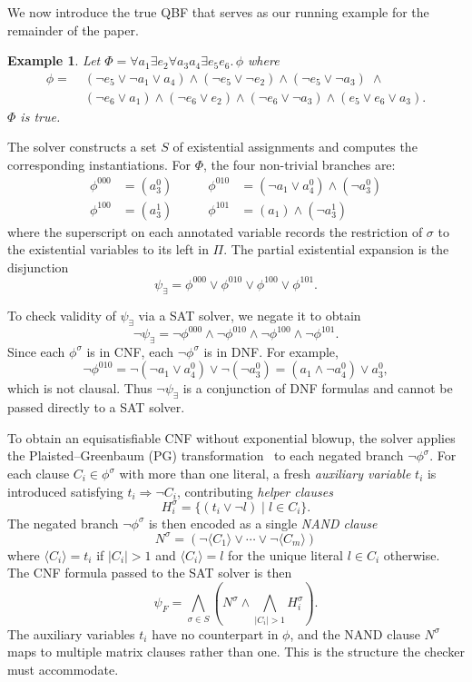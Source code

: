 \documentclass{article}
\newtheorem{example}{Example}
\begin{document}
We now introduce the true QBF that serves as our running example for the remainder
of the paper.

\begin{example}
    \label{ex:running-true}
    Let $\Phi = \forall a_1 \exists e_2 \forall a_3 a_4 \exists e_5 e_6.\, \phi$
    where
    \begin{align*}
        \phi = \; & (\neg e_5 \vee \neg a_1 \vee a_4) \wedge
        (\neg e_5 \vee \neg e_2) \wedge
        (\neg e_5 \vee \neg a_3) \;\wedge                    \\
                  & (\neg e_6 \vee a_1) \wedge
        (\neg e_6 \vee e_2) \wedge
        (\neg e_6 \vee \neg a_3) \wedge
        (e_5 \vee e_6 \vee a_3).
    \end{align*}
    $\Phi$ is true.
\end{example}


The solver constructs a set $S$ of existential assignments and computes the
corresponding instantiations. For $\Phi$, the four non-trivial branches are:
\begin{align*}
    \phi^{000} & = (a_3^0) \qquad & \phi^{010} & = (\neg a_1 \vee a_4^0) \wedge (\neg a_3^0) \\
    \phi^{100} & = (a_3^1) \qquad & \phi^{101} & = (a_1) \wedge (\neg a_3^1)
\end{align*}
where the superscript on each annotated variable records the restriction of $\sigma$
to the existential variables to its left in $\Pi$. The partial existential expansion
is the disjunction
\[
    \psi_\exists = \phi^{000} \vee \phi^{010} \vee \phi^{100} \vee \phi^{101}.
\]

To check validity of $\psi_\exists$ via a SAT solver, we negate it to obtain
\[
    \neg\psi_\exists = \neg\phi^{000} \wedge \neg\phi^{010} \wedge \neg\phi^{100}
    \wedge \neg\phi^{101}.
\]
Since each $\phi^\sigma$ is in CNF, each $\neg\phi^\sigma$ is in DNF. For example,
\[
    \neg\phi^{010} = \neg(\neg a_1 \vee a_4^0) \vee \neg(\neg a_3^0)
    = (a_1 \wedge \neg a_4^0) \vee a_3^0,
\]
which is not clausal. Thus $\neg\psi_\exists$ is a conjunction of DNF formulas and  cannot be passed directly to a SAT solver.

To obtain an equisatisfiable CNF without exponential blowup, the solver applies the
Plaisted--Greenbaum (PG) transformation~\cite{pg} to each negated branch $\neg\phi^\sigma$.
For each clause $C_i \in \phi^\sigma$ with more than one literal, a fresh
\emph{auxiliary variable} $t_i$ is introduced satisfying $t_i \Rightarrow \neg C_i$,
contributing \emph{helper clauses}
\[
    H_i^\sigma = \{(t_i \vee \neg l) \mid l \in C_i\}.
\]
The negated branch $\neg\phi^\sigma$ is then encoded as a single \emph{NAND clause}
\[
    N^\sigma = (\neg\langle C_1 \rangle \vee \cdots \vee \neg\langle C_m \rangle)
\]
where $\langle C_i \rangle = t_i$ if $|C_i| > 1$ and $\langle C_i \rangle = l$ for
the unique literal $l \in C_i$ otherwise. The CNF formula passed to the SAT solver
is then
\[
    \psi_F = \bigwedge_{\sigma \in S} \left( N^\sigma \wedge \bigwedge_{|C_i|>1} H_i^\sigma \right).
\]
The auxiliary variables $t_i$ have no counterpart in $\phi$, and the NAND clause
$N^\sigma$ maps to multiple matrix clauses rather than one. This is the structure
the checker must accommodate.
\end{document}
